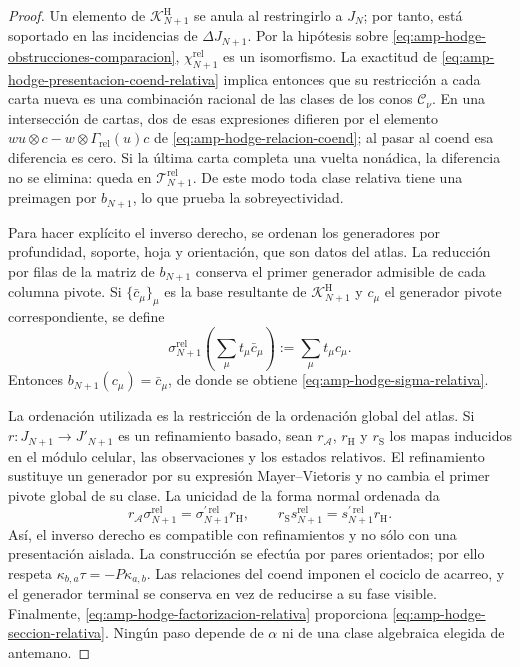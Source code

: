 \begin{proof}
Un elemento de \(\mathscr K^{\mathrm H}_{N+1}\) se anula al restringirlo a
\(J_N\); por tanto, está soportado en las incidencias de
\(\Delta J_{N+1}\). Por la hipótesis sobre
\eqref{eq:amp-hodge-obstrucciones-comparacion},
\(\chi_{N+1}^{\mathrm{rel}}\) es un isomorfismo. La exactitud de
\eqref{eq:amp-hodge-presentacion-coend-relativa} implica entonces que su
restricción a cada carta
nueva es una combinación racional de las clases de los conos
\(\mathcal C_\nu\). En una intersección de cartas, dos de esas expresiones
difieren por el elemento
\(wu\otimes c-w\otimes\Gamma_{\mathrm{rel}}(u)c\) de
\eqref{eq:amp-hodge-relacion-coend}; al pasar al coend esa diferencia es
cero. Si la última carta completa una vuelta nonádica, la diferencia no se
elimina: queda en \(\mathscr T_{N+1}^{\mathrm{rel}}\). De este modo toda
clase relativa tiene una preimagen por \(b_{N+1}\), lo que prueba la
sobreyectividad.

Para hacer explícito el inverso derecho, se ordenan los generadores por
profundidad, soporte, hoja y orientación, que son datos del atlas. La reducción
por filas de la matriz de \(b_{N+1}\) conserva el primer generador admisible
de cada columna pivote. Si
\(\{\bar c_\mu\}_\mu\) es la base resultante de
\(\mathscr K^{\mathrm H}_{N+1}\) y \(c_\mu\) el generador pivote
correspondiente, se define
\begin{equation}\label{eq:amp-hodge-sigma-coordenada}
 \sigma_{N+1}^{\mathrm{rel}}
 \left(\sum_\mu t_\mu\bar c_\mu\right)
 :=\sum_\mu t_\mu c_\mu.
\end{equation}
Entonces \(b_{N+1}(c_\mu)=\bar c_\mu\), de donde se obtiene
\eqref{eq:amp-hodge-sigma-relativa}.

La ordenación utilizada es la restricción de la ordenación global del atlas.
Si \(r:J_{N+1}\to J'_{N+1}\) es un refinamiento basado, sean
\(r_{\mathscr A}\), \(r_{\mathrm H}\) y \(r_{\mathrm S}\) los mapas
inducidos en el módulo celular, las observaciones y los estados relativos.
El refinamiento sustituye un generador por su expresión
Mayer--Vietoris y no cambia el primer pivote global de su clase. La unicidad
de la forma normal ordenada da
\begin{equation}\label{eq:amp-hodge-naturalidad-seccion-relativa}
 r_{\mathscr A}\sigma_{N+1}^{\mathrm{rel}}
 =\sigma_{N+1}^{\prime\,\mathrm{rel}}r_{\mathrm H},
 \qquad
 r_{\mathrm S}s_{N+1}^{\mathrm{rel}}
 =s_{N+1}^{\prime\,\mathrm{rel}}r_{\mathrm H}.
\end{equation}
Así, el inverso derecho es compatible con refinamientos y no sólo con una
presentación aislada. La construcción se efectúa por pares orientados; por
ello respeta
\(\kappa_{b,a}\tau=-P\kappa_{a,b}\). Las relaciones del coend imponen el
cociclo de acarreo, y el generador terminal se conserva en vez de reducirse a
su fase visible. Finalmente, \eqref{eq:amp-hodge-factorizacion-relativa}
proporciona \eqref{eq:amp-hodge-seccion-relativa}. Ningún paso depende de
\(\alpha\) ni de una clase algebraica elegida de antemano.
\end{proof}

